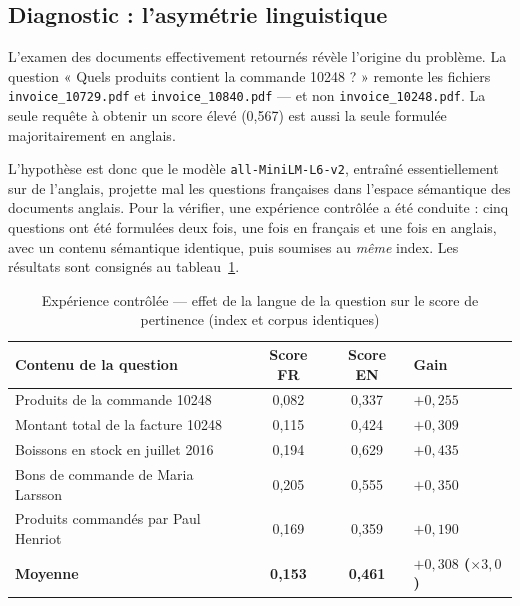 \subsection{Diagnostic : l'asymétrie linguistique}

L'examen des documents effectivement retournés révèle l'origine du problème. La
question « Quels produits contient la commande 10248 ? » remonte les fichiers
\texttt{invoice\_10729.pdf} et \texttt{invoice\_10840.pdf} --- et non
\texttt{invoice\_10248.pdf}. La seule requête à obtenir un score élevé (0,567)
est aussi la seule formulée majoritairement en anglais.

L'hypothèse est donc que le modèle \texttt{all-MiniLM-L6-v2}, entraîné
essentiellement sur de l'anglais, projette mal les questions françaises dans
l'espace sémantique des documents anglais. Pour la vérifier, une expérience
contrôlée a été conduite : cinq questions ont été formulées deux fois, une fois
en français et une fois en anglais, avec un contenu sémantique identique, puis
soumises au \emph{même} index. Les résultats sont consignés au
tableau~\ref{tab:langue}.

\begin{table}[htbp]
\centering
\caption{Expérience contrôlée --- effet de la langue de la question sur le score
de pertinence (index et corpus identiques)}
\label{tab:langue}
\small
\begin{tabular}{@{}p{5.4cm}ccp{3.6cm}@{}}
\toprule
\textbf{Contenu de la question} & \textbf{Score FR} & \textbf{Score EN} &
\textbf{Gain} \\
\midrule
Produits de la commande 10248        & 0,082 & 0,337 & $+0{,}255$ \\
Montant total de la facture 10248    & 0,115 & 0,424 & $+0{,}309$ \\
Boissons en stock en juillet 2016    & 0,194 & 0,629 & $+0{,}435$ \\
Bons de commande de Maria Larsson    & 0,205 & 0,555 & $+0{,}350$ \\
Produits commandés par Paul Henriot  & 0,169 & 0,359 & $+0{,}190$ \\
\midrule
\textbf{Moyenne}                     & \textbf{0,153} & \textbf{0,461} &
\textbf{$+0{,}308$ ($\times 3{,}0$)} \\
\bottomrule
\end{tabular}
\end{table}

